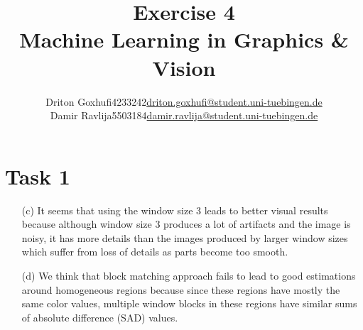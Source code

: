 \documentclass [a4paper, 11pt] {article}
\makeatletter
\newcommand{\courseName}{Machine Learning in Graphics \& Vision}
\newcommand{\homeworkNum}{4}
\newcommand{\studentOne}{Driton Goxhufi}
\newcommand{\studentTwo} {Damir Ravlija}
\newcommand{\matrikelNrStOne}{4233242}
\newcommand{\matrikelNrStTwo}{5503184}
\newcommand{\mailStOne}{driton.goxhufi@student.uni-tuebingen.de}
\newcommand{\mailStTwo}{damir.ravlija@student.uni-tuebingen.de}
\makeatother
\begin{document}
	
\title{\vspace{-1.5cm}\textbf{Exercise \homeworkNum} \\ 
	\courseName}
\author{\begin{tabular}{lcr}
		\studentOne & \matrikelNrStOne & \href{mailto:\mailStOne}{\mailStOne} \\
		\studentTwo & \matrikelNrStTwo & \href{mailto:\mailStTwo}{\mailStTwo} 
\end{tabular}}	
\date{}
\maketitle


\section*{Task 1}
\begin{enumerate}
\item[(c)]
It seems that using the window size 3 leads to better visual results because although window size 3 produces a lot of artifacts and the image is noisy, it has more details than the images produced by larger window sizes which suffer from loss of details as parts become too smooth.

\item[(d)]
We think that block matching approach fails to lead to good estimations around homogeneous regions because since these regions have mostly the same color values, multiple window blocks in these regions have similar sums of absolute difference (SAD) values.


\end{enumerate}
\end{document}
